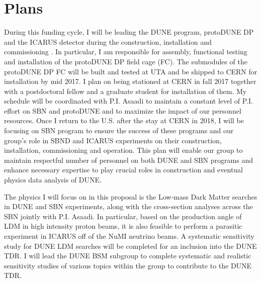 \section*{\textbf{Plans}}
During this funding cycle, I will be leading the DUNE program, protoDUNE DP and the ICARUS detector during the construction, installation and commissioning . In particular, I am responsible for assembly, functional testing and installation of the protoDUNE DP field cage (FC).  The submodules of the protoDUNE DP FC will be built and tested at UTA and be shipped to CERN for installation by mid 2017.  I plan on being stationed at CERN in fall 2017 together with a postdoctoral fellow and a graduate student for installation of them.  My schedule will be coordinated with P.I. Asaadi to maintain a constant level of P.I. effort on SBN and protoDUNE and to maximize the impact of our personnel resources.  Once I return to the U.S. after the stay at CERN in 2018, I will be focusing on SBN program to ensure the success of these programs and our group's role in SBND and ICARUS experiments on their construction, installation, commissioning and operation.  This plan will enable our group to maintain respectful number of personnel on both DUNE and SBN programs and enhance necessary expertise to play crucial roles in construction and eventual physics data analysis of DUNE.

The physics I will focus on in this proposal is the Low-mass Dark Matter searches in DUNE and SBN experiments, along with the cross-section analyses across the SBN jointly with P.I. Asaadi.  In particular, based on the production angle of LDM in high intensity proton beams, it is also feasible to perform a parasitic experiment in ICARUS off of the NuMI neutrino beams.   A systematic sensitivity study for DUNE LDM searches will be completed for an inclusion into the DUNE TDR.  I will lead the DUNE BSM subgroup to complete systematic and realistic sensitivity studies of various topics within the group to contribute to the DUNE TDR.



